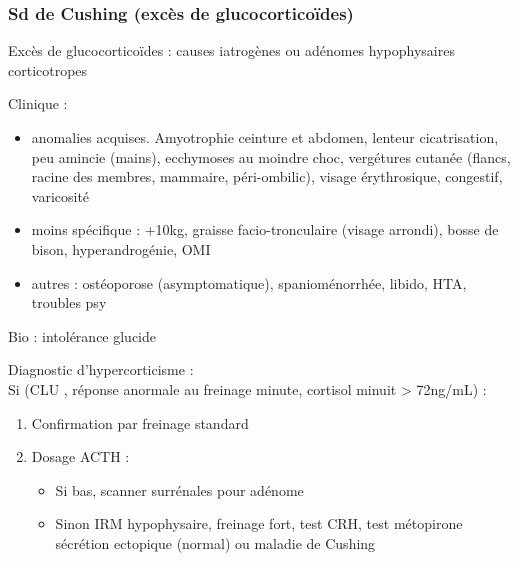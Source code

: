 \documentclass[11pt]{article}
\begin{document}
\subsubsection{Sd de Cushing (excès de glucocorticoïdes)}
\label{sec:org36107d4}
Excès de glucocorticoïdes : causes iatrogènes ou adénomes hypophysaires
corticotropes

Clinique :
\begin{itemize}
\item anomalies acquises. Amyotrophie ceinture et abdomen, lenteur cicatrisation,
peu amincie (mains), ecchymoses au moindre choc, vergétures cutanée (flancs,
racine des membres, mammaire, péri-ombilic), visage érythrosique, congestif,
varicosité
\item moins spécifique : +10kg, graisse facio-tronculaire (visage arrondi), bosse de
bison, hyperandrogénie, OMI
\item autres : ostéoporose (asymptomatique), spanioménorrhée, \dec libido, HTA,
troubles psy
\end{itemize}
Bio : intolérance glucide

\begin{tcolorbox}
Diagnostic d'hypercorticisme :\\
  Si (\acrshort{CLU} \inc, réponse anormale au freinage minute\footnotemark, cortisol minuit > 72ng/mL) :
\begin{enumerate}
  \item Confirmation par freinage standard\footnotemark
  \item Dosage ACTH : 
  \begin{itemize}
    \item Si bas, scanner surrénales pour adénome\footnotemark
    \item Sinon IRM hypophysaire, freinage fort, test CRH, 
    test métopirone \thus sécrétion ectopique (normal) ou maladie de Cushing
    \end{itemize}
\end{enumerate}
\end{tcolorbox}

\end{document}

